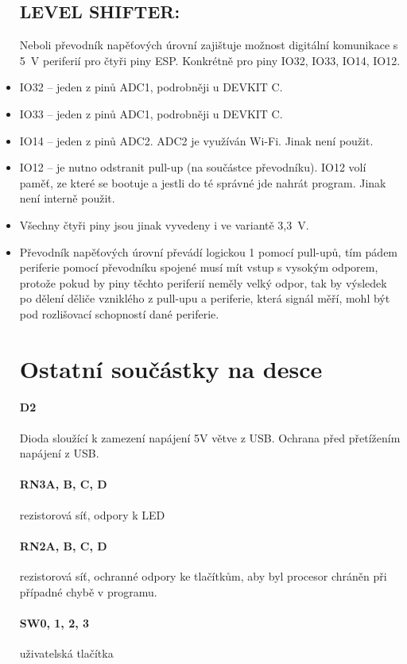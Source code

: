 \documentclass{template/socthesis}
\begin{document}
\begin{itemize}
	\subsection*{LEVEL SHIFTER:}
	Neboli převodník napěťových úrovní zajištuje možnost digitální komunikace s 5~V periferií pro čtyři piny ESP. Konkrétně pro piny IO32, IO33, IO14, IO12.
	\item IO32 – jeden z pinů ADC1, podrobněji u DEVKIT C.
	\item IO33 – jeden z pinů ADC1, podrobněji u DEVKIT C.
	\item IO14 – jeden z pinů ADC2. ADC2 je využíván Wi-Fi. Jinak není použit.
	\item IO12 – je nutno odstranit pull-up (na součástce převodníku). IO12 volí paměť,
	ze které se bootuje a jestli do té správné jde nahrát program. Jinak není interně použit.
	\item Všechny čtyři piny jsou jinak vyvedeny i ve variantě 3,3~V.
	\item Převodník napěťových úrovní převádí logickou 1 pomocí pull-upů, tím pádem periferie pomocí převodníku spojené musí mít vstup s vysokým odporem, protože pokud by piny těchto periferií neměly velký odpor, tak by výsledek po dělení děliče vzniklého z pull-upu a periferie, která signál měří, mohl být pod rozlišovací schopností dané periferie.
	
	\section{Ostatní součástky na desce}
	
	\paragraph{D2}
	Dioda sloužící k zamezení napájení 5V větve z USB.
	Ochrana před přetížením napájení z USB.
	
	\paragraph{RN3A, B, C, D}
	rezistorová síť, odpory k LED
	
	\paragraph*{RN2A, B, C, D}
	rezistorová síť, ochranné odpory ke tlačítkům, aby 
	byl procesor chráněn při případné chybě 
	v programu.
	
	\paragraph*{SW0, 1, 2, 3}
	uživatelská tlačítka
	

\end{itemize}
\end{document}
